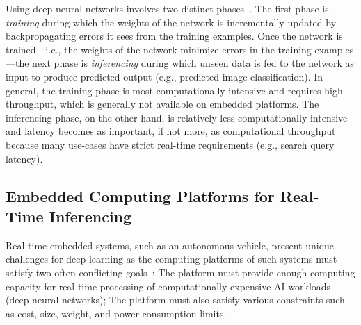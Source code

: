 Using deep neural networks involves two distinct
phases~\cite{NVIDIA2015}. The first
phase is \emph{training} during which the weights of the network is
incrementally updated by backpropagating errors it sees from the
training examples. Once the network is trained---i.e., the weights of
the network minimize errors in the training examples---the next phase
is \emph{inferencing} during which unseen data is fed to the network
as input to produce predicted output (e.g., predicted image
classification). In general, the training phase is most computationally
intensive and requires high throughput, which is generally not
available on embedded platforms. The inferencing phase, on the
other hand, is relatively less computationally intensive and latency becomes
as important, if not more, as computational throughput because many
use-cases have strict real-time requirements (e.g., search query
latency).





\subsection{Embedded Computing Platforms for Real-Time Inferencing}
Real-time embedded systems, such as an autonomous vehicle, present
unique challenges for deep learning as the computing platforms of such
systems must satisfy two often conflicting goals~\cite{Otterness2017}:
The platform must provide 
enough computing capacity for real-time processing of computationally
expensive AI workloads (deep neural networks);
The platform must also satisfy various
constraints such as cost, size, weight, and power consumption limits.

